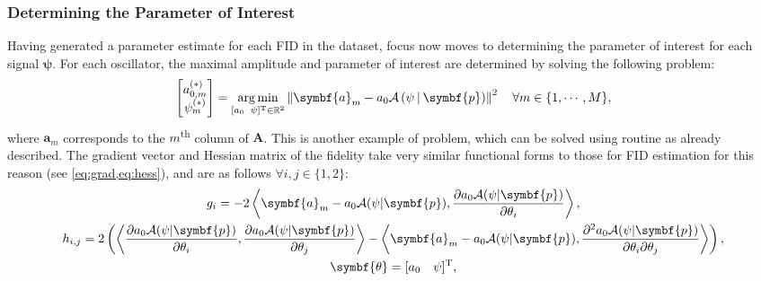 \subsubsection{Determining the Parameter of Interest}
Having generated a parameter estimate for each \ac{FID} in the dataset, focus
now moves to determining the parameter of interest for each signal $\symbf{\psi}$.
For each oscillator, the maximal amplitude and parameter of
interest are determined by solving the following problem:
\begin{equation}
    \begin{bmatrix}
        a_{0,m}^{(*)} \\
        \psi_{m}^{(*)}
    \end{bmatrix} =
    \argmin_{
        [a_0 \hspace*{5pt} \psi]\T \in \mathbb{R}^2
    }
    \left\lVert
        \symbf{a}_m - a_0 \mathcal{A} \left(\psi \hspace*{2pt} | \hspace*{2pt} \symbf{p}\right)
    \right\rVert^2 \quad  \forall m \in \lbrace 1, \cdots, M \rbrace,
\end{equation}
where $\symbf{a}_m$ corresponds to the $m$\textsuperscript{th} column of
$\symbf{A}$.  This is another example of  problem, which can be solved using
 routine as already described. The gradient vector and Hessian matrix
of the fidelity take very similar functional forms to those for \ac{FID}
estimation for this reason (see \cref{eq:grad,eq:hess}), and are as
follows $\forall
i, j \in \lbrace 1, 2 \rbrace$:
\begin{subequations}
    \begin{gather}
        g_i =
            -2 \left \langle
                \symbf{a}_m - a_0 \mathcal{A}(\psi | \symbf{p}),
                \frac{\partial a_0 \mathcal{A} (\psi | \symbf{p})}
                {\partial \theta_i}
            \right \rangle,\\
        h_{i,j} =
            2 \left( \left \langle
                \frac{\partial a_0 \mathcal{A} (\psi | \symbf{p})}{\partial \theta_i},
                \frac{\partial a_0 \mathcal{A} (\psi | \symbf{p})}{\partial \theta_j}
            \right \rangle -
            \left \langle
                \symbf{a}_m - a_0 \mathcal{A}(\psi | \symbf{p}),
                \frac{\partial^2 a_0 \mathcal{A} (\psi | \symbf{p})}{\partial
                \theta_i\partial \theta_j}
            \right \rangle \right), \\
            \symbf{\theta} = [a_0 \hspace*{10pt} \psi]\T,
    \end{gather}
\end{subequations}
